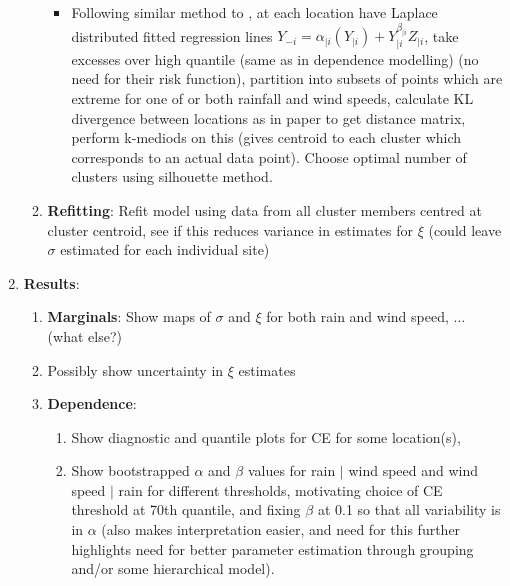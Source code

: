 \documentclass{article}
\numberwithin{equation}{section}
\begin{document}
\begin{enumerate}
\begin{enumerate}
\begin{itemize}
          \item Following similar method to \cite{Vignotto2021}, at each location have Laplace distributed fitted regression lines $Y_{-i} = \alpha_{\mid i}(Y_{\mid i}) + Y_{\mid i}^{\beta_{\mid i}} Z_{\mid i}$, take excesses over high quantile (same as in dependence modelling) (no need for their risk function), partition into subsets of points which are extreme for one of or both rainfall and wind speeds, calculate KL divergence between locations as in paper to get distance matrix, perform k-mediods on this (gives centroid to each cluster which corresponds to an actual data point). Choose optimal number of clusters using silhouette method. 
        \end{itemize}
      \item \textbf{Refitting}: Refit model using data from all cluster members centred at cluster centroid, see if this reduces variance in estimates for $\xi$ (could leave $\sigma$ estimated for each individual site) 
    \end{enumerate}
  \item \textbf{Results}: 
    \begin{enumerate}
      \item \textbf{Marginals}: Show maps of $\sigma$ and $\xi$ for both rain and wind speed, $\ldots$ (what else?)
      \item Possibly show uncertainty in $\xi$ estimates
      \item \textbf{Dependence}:
        \begin{enumerate}
          \item Show diagnostic and quantile plots for CE for some location(s),
          \item Show bootstrapped $\alpha$ and $\beta$ values for rain $\mid$ wind speed and wind speed $\mid$ rain for different thresholds, motivating choice of CE threshold at 70th quantile, and fixing $\beta$ at 0.1 so that all variability is in $\alpha$ (also makes interpretation easier, and need for this further highlights need for better parameter estimation through grouping and/or some hierarchical model). 

\end{enumerate}
\end{enumerate}
\end{enumerate}
\end{document}
